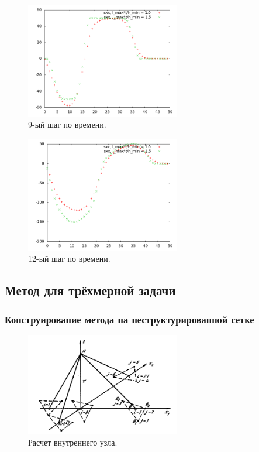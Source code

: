 \begin{figure}[htp]
\centering
\includegraphics[width=0.6\textwidth]{png/big-sigma-test-results-1d/snap-9.png}
\caption{9-ый шаг по времени.}
\end{figure}

\begin{figure}[htp]
\centering
\includegraphics[width=0.6\textwidth]{png/big-sigma-test-results-1d/snap-12.png}
\caption{12-ый шаг по времени.}
\end{figure}

\clearpage
\newpage

\subsection{Метод для трёхмерной задачи}

\subsubsection{Конструирование метода на неструктурированной сетке}

\begin{figure}[htp]
\centering
\includegraphics[width=0.6\textwidth]{png/characteristics-2d-triangles-inner.png}
\caption{Расчет внутреннего узла.}
\end{figure}

